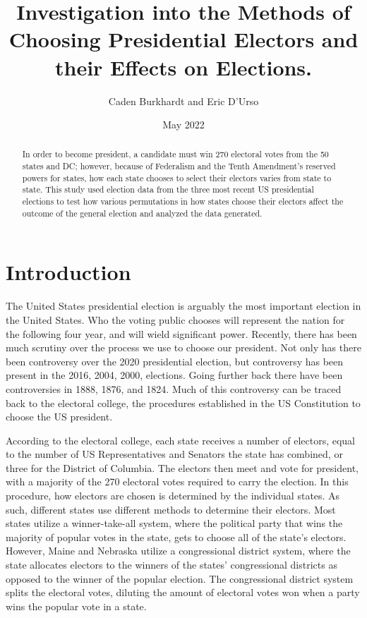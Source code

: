 \documentclass{article}
\title{Investigation into the Methods of Choosing Presidential Electors and their Effects on Elections.}
\author{Caden Burkhardt and Eric D'Urso}
\date{May 2022}
\begin{document}
\maketitle

\begin{abstract}
    In order to become president, a candidate must win 270 electoral votes from the 50 states and DC; however, because of Federalism and the Tenth Amendment’s reserved powers for states, how each state chooses to select their electors varies from state to state. This study used election data from the three most recent US presidential elections to test how various permutations in how states choose their electors affect the outcome of the general election and analyzed the data generated.
\end{abstract}

\section{Introduction}
The United States presidential election is arguably the most important election in the United States. Who the voting public chooses will represent the nation for the following four year, and will wield significant power.  Recently, there has been much scrutiny over the process we use to choose our president. Not only has there been controversy over the 2020 presidential election, but controversy has been present in the 2016, 2004, 2000, elections. Going further back there have been controversies in 1888, 1876, and 1824. Much of this controversy can be traced back to the electoral college, the procedures established in the US Constitution to choose the US president. 

According to the electoral college, each state receives a number of electors, equal to the number of US Representatives and Senators the state has combined, or three for the District of Columbia. The electors then meet and vote for president, with a majority of the 270 electoral votes required to carry the election. In this procedure, how electors are chosen is determined by the individual states. As such, different states use different methods to determine their electors. Most states utilize a winner-take-all system, where the political party that wins the majority of popular votes in the state, gets to choose all of the state's electors. However, Maine and Nebraska utilize a congressional district system, where the state allocates electors to the winners of the states’ congressional districts as opposed to the winner of the popular election. The congressional district system splits the electoral votes, diluting the amount of electoral votes won when a party wins the popular vote in a state.
\end{document}
